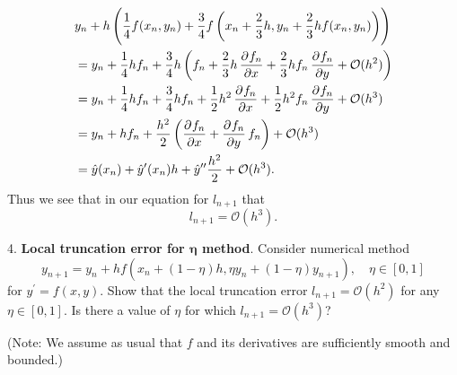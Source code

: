 \documentclass{article}
\newcommand{\Oh}{\mathcal{O}}
\begin{document}
\begin{align*}
    &y_{n} + h \del{\frac{1}{4} f(x_n, y_n) + \frac{3}{4} f\del{x_n + \frac{2}{3} h, y_n + \frac{2}{3}h f(x_n, y_n)}} \\
        &= y_n
            + \frac{1}{4} h f_n
            + \frac{3}{4} h \del{
                f_n
                + \frac{2}{3} h \dpd{f_n}{x}
                + \frac{2}{3} h f_n \dpd{f_n}{y}
                + \Oh(h^2)
            }
            \\
        &= y_n
            + \frac{1}{4} h f_n
            + \frac{3}{4} h f_n
            + \frac{1}{2} h^2 \dpd{f_n}{x}
            + \frac{1}{2} h^2 f_n \dpd{f_n}{y}
            + \Oh(h^3)
            \\
        &= y_n + h f_n + \frac{h^2}{2} \del{\dpd{f_n}{x} + \dpd{f_n}{y} f_n} + \Oh(h^3)
        \\
        &= \hat{y}(x_{n}) + \hat{y}^\prime(x_n)h + \hat{y}^{\prime \prime} \frac{h^2}{2} + \Oh(h^3)
        .
\end{align*}
%
Thus we see that in our equation for $l_{n + 1}$ that
%
\begin{equation*}
    l_{n + 1} = \Oh(h^3)
    .
\end{equation*}

\newpage

4. \textbf{Local truncation error for $\boldsymbol\eta$ method}.
Consider numerical method
%
\begin{equation*}
    y_{n + 1} = y_n + h f(x_n + (1 - \eta) h, \eta y_n + (1 - \eta) y_{n + 1}), \quad \eta \in [0, 1]
\end{equation*}
%
for $y^\prime = f(x, y)$. Show that the local truncation error $l_{n + 1} = \Oh(h^2)$ for any $\eta \in [0, 1]$. Is there
a value of $\eta$ for which $l_{n + 1} = \Oh(h^3)$?

(Note: We assume as usual that $f$ and its derivatives are sufficiently smooth and bounded.)
\end{document}
